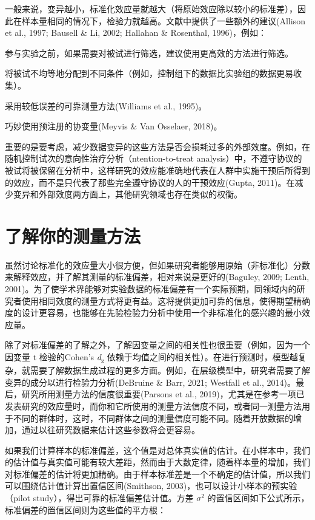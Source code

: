 \documentclass[
  letterpaper,
  DIV=11,
  numbers=noendperiod]{scrreprt}
\begin{document}
一般来说，变异越小，标准化效应量就越大（将原始效应除以较小的标准差），因此在样本量相同的情况下，检验力就越高。文献中提供了一些额外的建议(Allison
et al., 1997; Bausell \& Li, 2002; Hallahan \& Rosenthal, 1996)，例如：

参与实验之前，如果需要对被试进行筛选，建议使用更高效的方法进行筛选。

将被试不均等地分配到不同条件（例如，控制组下的数据比实验组的数据更易收集）。

采用较低误差的可靠测量方法(Williams et al., 1995)。

巧妙使用预注册的协变量(Meyvis \& Van Osselaer, 2018)。

重要的是要考虑，减少数据变异的这些方法是否会损耗过多的外部效度。例如，在随机控制试次的意向性治疗分析（ntention-to-treat
analysis）中，不遵守协议的被试将被保留在分析中，这样研究的效应能准确地代表在人群中实施干预后所得到的效应，而不是只代表了那些完全遵守协议的人的干预效应(Gupta,
2011)。在减少变异和外部效度两方面上，其他研究领域也存在类似的权衡。

\hypertarget{sec-knowyourmeasure}{%
\section{了解你的测量方法}\label{sec-knowyourmeasure}}

虽然讨论标准化的效应量大小很方便，但如果研究者能够用原始（非标准化）分数来解释效应，并了解其测量的标准偏差，相对来说是更好的(Baguley,
2009; Lenth,
2001)。为了使学术界能够对实验数据的标准偏差有一个实际预期，同领域内的研究者使用相同效度的测量方式将更有益。这将提供更加可靠的信息，使得期望精确度的设计更容易，也能够在先验检验力分析中使用一个非标准化的感兴趣的最小效应量。

除了对标准偏差的了解之外，了解因变量之间的相关性也很重要（例如，因为一个因变量
t 检验的Cohen's \emph{d}\textsubscript{z}
依赖于均值之间的相关性）。在进行预测时，模型越复杂，就需要了解数据生成过程的更多方面。例如，在层级模型中，研究者需要了解变异的成分以进行检验力分析(DeBruine
\& Barr, 2021; Westfall et al.,
2014)。最后，研究所用测量方法的信度很重要(Parsons et al.,
2019)，尤其是在参考一项已发表研究的效应量时，而你和它所使用的测量方法信度不同，或者同一测量方法用于不同的群体时，这时，不同群体之间的测量信度可能不同。随着开放数据的增加，通过以往研究数据来估计这些参数将会更容易。

如果我们计算样本的标准偏差，这个值是对总体真实值的估计。在小样本中，我们的估计值与真实值可能有较大差距，然而由于大数定律，随着样本量的增加，我们对标准偏差的估计将更加精确。由于样本标准差是一个不确定的估计值，所以我们可以围绕估计值计算出置信区间(Smithson,
2003)，也可以设计小样本的预实验（pilot
study），得出可靠的标准偏差估计值。方差 \(\sigma^2\)
的置信区间如下公式所示，标准偏差的置信区间则为这些值的平方根：
\end{document}
